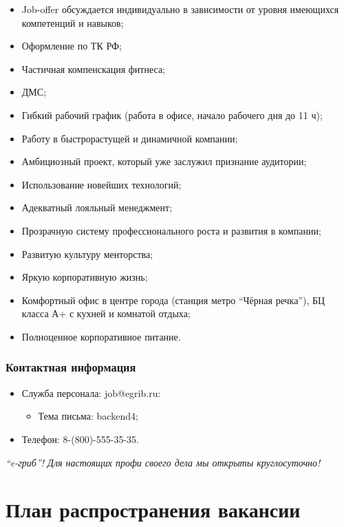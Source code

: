 \documentclass[a4paper,8pt]{article}
\begin{document}
    \begin{itemize}
        \item Job-offer обсуждается индивидуально в зависимости от уровня имеющихся компетенций и навыков;
        \item Оформление по ТК РФ;
        \item Частичная компенскация фитнеса;
        \item ДМС;
        \item Гибкий рабочий график (работа в офисе, начало рабочего дня до 11 ч);
        \item Работу в быстрорастущей и динамичной компании;
        \item Амбициозный проект, который уже заслужил признание аудитории;
        \item Использование новейших технологий;
        \item Адекватный лояльный менеджмент;
        \item Прозрачную систему профессионального роста и развития в компании;
        \item Развитую культуру менторства;
        \item Яркую корпоративную жизнь;
        \item Комфортный офис в центре города (станция метро ``Чёрная речка''), БЦ класса А+ с кухней и комнатой отдыха;
        \item Полноценное корпоративное питание.
    \end{itemize}

\subsubsection*{Контактная информация}
    \begin{itemize}
        \item Служба персонала: job@egrib.ru:
            \begin{itemize}
                \item Тема письма: backend4;
            \end{itemize}
        \item Телефон: 8-(800)-555-35-35.
    \end{itemize}

\textit{``e-гриб''! Для настоящих профи своего дела мы открыты круглосуточно!}


\newpage
\section*{План распространения вакансии}
\end{document}
